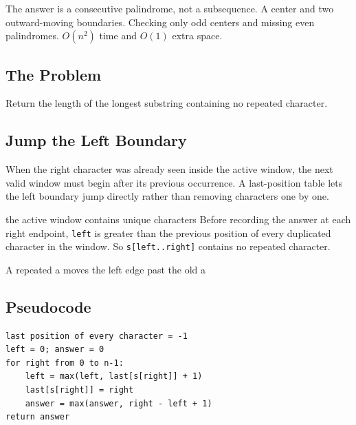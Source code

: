 \chaptercheckpoint
  {The answer is a consecutive palindrome, not a subsequence.}
  {A center and two outward-moving boundaries.}
  {Checking only odd centers and missing even palindromes.}
  {$O(n^2)$ time and $O(1)$ extra space.}



\subsection{The Problem}
Return the length of the longest substring containing no repeated character.

\subsection{Jump the Left Boundary}
When the right character was already seen inside the active window, the next
valid window must begin after its previous occurrence. A last-position table
lets the left boundary jump directly rather than removing characters one by
one.

\begin{invariantbox}{the active window contains unique characters}
Before recording the answer at each right endpoint, \texttt{left} is greater
than the previous position of every duplicated character in the window.
So \texttt{s[left..right]} contains no repeated character.
\end{invariantbox}

\begin{visualbox}{A repeated a moves the left edge past the old a}
\centering
{}
\end{visualbox}

\subsection{Pseudocode}
\begin{lstlisting}[style=pseudocode]
last position of every character = -1
left = 0; answer = 0
for right from 0 to n-1:
    left = max(left, last[s[right]] + 1)
    last[s[right]] = right
    answer = max(answer, right - left + 1)
return answer
\end{lstlisting}

